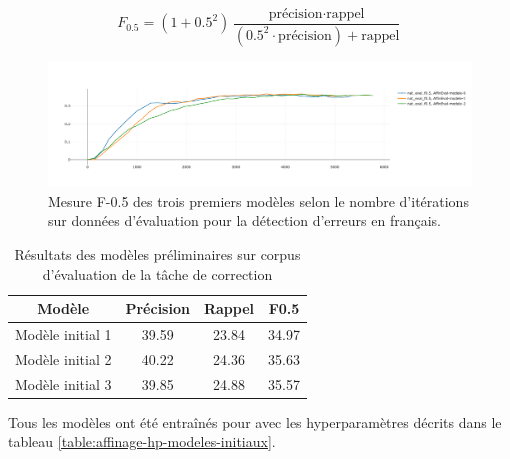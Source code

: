 \documentclass[12pt,twoside,rapport]{dms}
\theoremstyle{definition}
\numberwithin{equation}{section}
\numberwithin{table}{chapter}
\numberwithin{figure}{chapter}
\begin{document}
\begin{equation*} \label{eq:f05}
	F_{0.5}=(1+0.5^2)\frac{\text{précision}\cdot\text{rappel}}{(0.5^2 \cdot \text{précision}) + \text{rappel}}
\end{equation*}


\begin{figure}
	\begin{center}
		\includegraphics[width=1.40\textwidth]{figures/3premiersmodelesf05.png}
	\end{center}
	\caption{Mesure F-0.5 des trois premiers modèles selon le nombre d'itérations sur données d'évaluation pour la détection d'erreurs en français.}
	\label{fig:3premiermodeles}
\end{figure}

\begin{table}
	\centering
	\begin{tabular}{||c | c | c | c||}
		\hline
		Modèle           & Précision & Rappel & F0.5  \\ [0.5ex]
		\hline\hline
		Modèle initial 1 & 39.59     & 23.84  & 34.97 \\
		Modèle initial 2 & 40.22     & 24.36  & 35.63 \\
		Modèle initial 3 & 39.85     & 24.88  & 35.57 \\
		\hline
	\end{tabular}
	\caption{Résultats des modèles préliminaires sur corpus d'évaluation de la tâche de correction}
	\label{table:premiermodeles}
\end{table}
Tous les modèles ont été entraînés pour avec les hyperparamètres décrits dans
le tableau \ref{table:affinage-hp-modeles-initiaux}.
\end{document}
